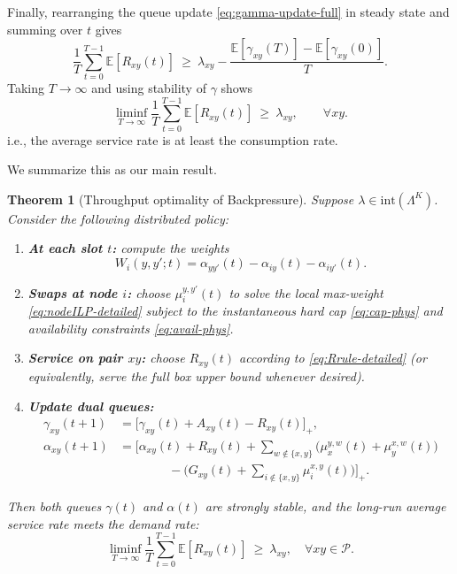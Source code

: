 \documentclass[11pt]{article}
\newtheorem{theorem}{Theorem}
\newcommand{\E}{\mathbb{E}}
\newcommand{\Pairs}{\mathcal{P}} %
\begin{document}
Finally, rearranging the queue update \eqref{eq:gamma-update-full} in steady state and summing over $t$ gives
\[
\frac{1}{T}\sum_{t=0}^{T-1}\E[R_{xy}(t)]
\ \ge\
\lambda_{xy}
- \frac{\E[\gamma_{xy}(T)]-\E[\gamma_{xy}(0)]}{T}.
\]
Taking $T\to\infty$ and using stability of $\gamma$ shows
\[
\liminf_{T\to\infty}
\frac{1}{T}\sum_{t=0}^{T-1}\E[R_{xy}(t)]
\ \ge\ \lambda_{xy},
\qquad \forall xy.
\]
i.e., the average service rate is at least the consumption rate.

We summarize this as our main result.

\begin{theorem}[Throughput optimality of Backpressure]
\label{thm:main}
Suppose $\lambda\in\mathrm{int}(\Lambda^K)$. Consider the following distributed policy:

\begin{enumerate}[leftmargin=2em,label=(\roman*)]
\item \textbf{At each slot $t$:} compute the weights
\[
W_i(y,y';t)=\alpha_{yy'}(t)-\alpha_{iy}(t)-\alpha_{iy'}(t).
\]

\item \textbf{Swaps at node $i$:} choose $\mu_i^{y,y'}(t)$ to solve the local max-weight \eqref{eq:nodeILP-detailed} subject to the instantaneous hard cap \eqref{eq:cap-phys} and availability constraints \eqref{eq:avail-phys}.

\item \textbf{Service on pair $xy$:} choose $R_{xy}(t)$ according to \eqref{eq:Rrule-detailed} (or equivalently, serve the full box upper bound whenever desired).

\item \textbf{Update dual queues:}
\begin{align*}
\gamma_{xy}(t{+}1)
&=\big[\gamma_{xy}(t)+A_{xy}(t)-R_{xy}(t)\big]_+,\\
\alpha_{xy}(t{+}1)
&=\Big[\alpha_{xy}(t)
+ R_{xy}(t)
+ \sum_{w\notin\{x,y\}}\big(\mu_x^{y,w}(t)+\mu_y^{x,w}(t)\big)\\
&\qquad\qquad
- \Big(G_{xy}(t)+\sum_{i\notin\{x,y\}}\mu_i^{x,y}(t)\Big)
\Big]_+.
\end{align*}
\end{enumerate}

Then both queues $\gamma(t)$ and $\alpha(t)$ are strongly stable, and the long-run average service rate meets the demand rate:
\[
\liminf_{T\to\infty}
\frac1T \sum_{t=0}^{T-1}\E[R_{xy}(t)]
\ \ge\ \lambda_{xy},
\quad \forall xy\in\Pairs.
\]
\end{theorem}
\end{document}
